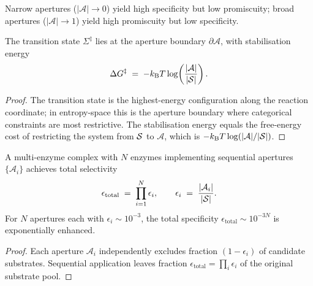 \begin{corollary}
\label{cor:ch03-spec-promiscuity}
Narrow apertures ($|\mathcal{A}|\to 0$) yield high specificity but low
promiscuity; broad apertures ($|\mathcal{A}|\to 1$) yield high promiscuity
but low specificity.
\end{corollary}

\begin{theorem}
\label{thm:ch03-transition-state}
The transition state $\Sigma^\ddagger$ lies at the aperture boundary
$\partial\mathcal{A}$, with stabilisation energy
\begin{equation}
    \Delta G^\ddagger
    \;=\;
    -k_{\mathrm{B}} T\log\!\left(\frac{|\mathcal{A}|}{|\mathcal{S}|}\right).
    \label{eq:ch03-dG-ddagger}
\end{equation}
\end{theorem}

\begin{proof}
The transition state is the highest-energy configuration along the reaction
coordinate; in entropy-space this is the aperture boundary where categorical
constraints are most restrictive.  The stabilisation energy equals the free-energy
cost of restricting the system from $\mathcal{S}$ to $\mathcal{A}$, which is
$-k_{\mathrm{B}} T\log(|\mathcal{A}|/|\mathcal{S}|)$.
\end{proof}

\begin{theorem}
\label{thm:ch03-sequential-exclusion}
A multi-enzyme complex with $N$ enzymes implementing sequential apertures
$\{\mathcal{A}_i\}$ achieves total selectivity
\begin{equation}
    \epsilon_\mathrm{total}
    \;=\;
    \prod_{i=1}^{N} \epsilon_i,
    \qquad
    \epsilon_i \;=\; \frac{|\mathcal{A}_i|}{|\mathcal{S}|}.
    \label{eq:ch03-sequential}
\end{equation}
For $N$ apertures each with $\epsilon_i\sim 10^{-3}$, the total specificity
$\epsilon_\mathrm{total}\sim 10^{-3N}$ is exponentially enhanced.
\end{theorem}

\begin{proof}
Each aperture $\mathcal{A}_i$ independently excludes fraction $(1-\epsilon_i)$ of
candidate substrates.  Sequential application leaves fraction
$\epsilon_\mathrm{total}=\prod_i\epsilon_i$ of the original substrate pool.
\end{proof}

